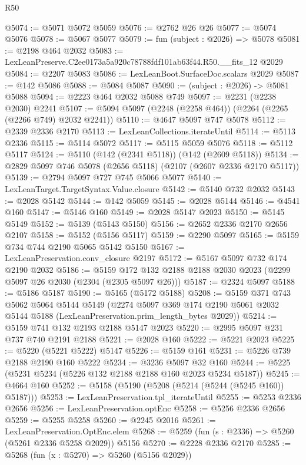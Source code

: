 \begin{lexlean}{R50}
\begin{coremodule}
@5074 := @5071 @5072 @5059
@5076 := @2762 @26 @26
@5077 := @5074 @5076
@5078 := @5067 @5077
@5079 := fun (subject : @2026) => @5078
@5081 := @2198 @464 @2032
@5083 := LexLeanPreserve.C2ee0173a5a920c78788fdf101ab63f44.R50.__fits_12 @2029
@5084 := @2207 @5083
@5086 := LexLeanBoot.SurfaceDoc.scalars @2029
@5087 := @142 @5086
@5088 := @5084 @5087
@5090 := (subject : @2026) -> @5081 @5088
@5094 := @2223 @464 @2032 @5088 @749
@5097 := @2231 (@2238 @2030) @2241
@5107 := @5094 @5097 (@2248 (@2258 @464)) (@2264 (@2265 (@2266 @749) @2032 @2241))
@5110 := @4647 @5097 @747 @5078
@5112 := @2339 @2336 @2170
@5113 := LexLeanCollections.iterateUntil
@5114 := @5113 @2336
@5115 := @5114 @5072
@5117 := @5115 @5059 @5076
@5118 := @5112 @5117
@5124 := @5110 (@142 (@2341 @5118)) (@142 (@2609 @5118))
@5134 := @2829 @5097 @746 @5078 (@2656 @5118) (@2107 (@2607 @2336 @2170 @5117))
@5139 := @2794 @5097 @727 @745 @5066 @5077
@5140 := LexLeanTarget.TargetSyntax.Value.closure
@5142 := @5140 @732 @2032
@5143 := @2028 @5142
@5144 := @142 @5059
@5145 := @2028 @5144
@5146 := @4541 @160
@5147 := @5146 @160
@5149 := @2028 @5147 @2023
@5150 := @5145 @5149
@5152 := @5139 (@5143 @5150)
@5156 := @2652 @2336 @2170 @2656 @2107
@5158 := @5152 (@5156 @5117)
@5159 := @2290 @5097
@5165 := @5159 @734 @744 @2190 @5065 @5142 @5150
@5167 := LexLeanPreservation.conv_closure @2197
@5172 := @5167 @5097 @732 @174 @2190 @2032
@5186 := @5159 @172 @132 @2188 @2188 @2030 @2023 (@2299 @5097 @26 @2030 (@2304 (@2305 @5097 @26)))
@5187 := @2324 @5097
@5188 := @5186 @5187
@5190 := @5165 (@5172 @5188)
@5208 := @5159
    @371
    @743
    @5062
    @5064
    @5144
    @5149
    (@2274
      @5097
      @369
      @174
      @2190
      @5061
      @2032
      @5144
      @5188
      (LexLeanPreservation.prim_length_bytes @2029))
@5214 := @5159 @741 @132 @2193 @2188 @5147 @2023
@5220 := @2995 @5097 @231 @737 @740 @2191 @2188
@5221 := @2028 @160
@5222 := @5221 @2023
@5225 := @5220 (@5221 @5222) @5147
@5226 := @5159 @161
@5231 := @5226 @739 @2188 @2190 @160 @5222
@5234 := @3236 @5097 @32 @160
@5244 := @5225 (@5231 @5234 (@5226 @132 @2188 @2188 @160 @2023 @5234 @5187))
@5245 := @4664 @160
@5252 := @5158 (@5190 (@5208 (@5214 (@5244 (@5245 @160)) @5187)))
@5253 := LexLeanPreservation.tpl_iterateUntil
@5255 := @5253 @2336 @2656
@5256 := LexLeanPreservation.optEnc
@5258 := @5256 @2336 @2656
@5259 := @5255 @5258
@5260 := @2245 @2016
@5261 := LexLeanPreservation.OptEnc.elem
@5268 := @5259 (fun (s : @2336) => @5260 (@5261 @2336 @5258 @2029)) @5156
@5270 := @2228 @2336 @2170
@5285 := @5268
    (fun (x : @5270) => @5260 (@5156 @2029))

\end{coremodule}
\end{lexlean}
